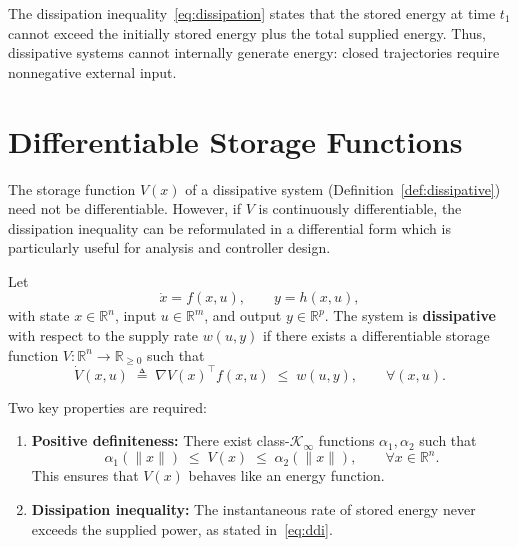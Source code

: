 \begin{remark}
The dissipation inequality~\eqref{eq:dissipation} states that the stored energy at time $t_1$ 
cannot exceed the initially stored energy plus the total supplied energy.  
Thus, dissipative systems cannot internally generate energy: closed trajectories require 
nonnegative external input.
\end{remark}

\section{Differentiable Storage Functions}

The storage function $V(x)$ of a dissipative system (Definition~\ref{def:dissipative}) 
need not be differentiable. However, if $V$ is continuously differentiable, the dissipation 
inequality can be reformulated in a differential form which is particularly useful for 
analysis and controller design.

\begin{definition}\label{def:ddi}
Let
\[
\dot{x} = f(x,u), 
\qquad y = h(x,u),
\]
with state $x \in \mathbb{R}^n$, input $u \in \mathbb{R}^m$, and output $y \in \mathbb{R}^p$.  
The system is \textbf{dissipative} with respect to the supply rate $w(u,y)$ if there exists 
a differentiable storage function $V : \mathbb{R}^n \to \mathbb{R}_{\ge 0}$ such that
\begin{equation}\label{eq:ddi}
\dot{V}(x,u) \;\triangleq\; \nabla V(x)^\top f(x,u) \;\le\; w(u,y), 
\qquad \forall (x,u).
\end{equation}
\end{definition}

\begin{remark}
Two key properties are required:
\begin{enumerate}
    \item \textbf{Positive definiteness:} There exist class-$\mathcal{K}_\infty$ functions 
    $\alpha_1, \alpha_2$ such that
    \[
    \alpha_1(\|x\|) \;\le\; V(x) \;\le\; \alpha_2(\|x\|), \qquad \forall x \in \mathbb{R}^n.
    \]
    This ensures that $V(x)$ behaves like an energy function.
    \item \textbf{Dissipation inequality:} The instantaneous rate of stored energy never 
    exceeds the supplied power, as stated in~\eqref{eq:ddi}.
\end{enumerate}
\end{remark}

